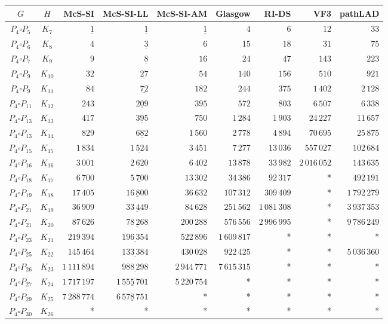 
\begin{tabular}{ccrrrrrrr}
    \toprule
    {$G$} & {$H$} & {McS-SI} & {McS-SI-LL} & {McS-SI-AM} & Glasgow & RI-DS & VF3 & pathLAD \\ 
    \midrule

$P_4\square P_{5}$ & $K_{7}$ & $\underline{1}$ & $\underline{1}$ & $\underline{1}$ & $4$ & $6$ & $12$ & $33$\\
$P_4\square P_{6}$ & $K_{8}$ & $4$ & $\underline{3}$ & $6$ & $15$ & $18$ & $31$ & $75$\\
$P_4\square P_{7}$ & $K_{9}$ & $9$ & $\underline{8}$ & $16$ & $24$ & $47$ & $143$ & $223$\\
$P_4\square P_{9}$ & $K_{10}$ & $32$ & $\underline{27}$ & $54$ & $140$ & $156$ & $510$ & $921$\\
$P_4\square P_{9}$ & $K_{11}$ & $84$ & $\underline{72}$ & $182$ & $244$ & $375$ & $1\,402$ & $2\,128$\\
$P_4\square P_{11}$ & $K_{12}$ & $243$ & $\underline{209}$ & $395$ & $572$ & $803$ & $6\,507$ & $6\,338$\\
$P_4\square P_{13}$ & $K_{13}$ & $417$ & $\underline{395}$ & $750$ & $1\,284$ & $1\,903$ & $24\,227$ & $11\,657$\\
$P_4\square P_{13}$ & $K_{14}$ & $829$ & $\underline{682}$ & $1\,560$ & $2\,778$ & $4\,894$ & $70\,695$ & $25\,875$\\
$P_4\square P_{15}$ & $K_{15}$ & $1\,834$ & $\underline{1\,524}$ & $3\,451$ & $7\,277$ & $13\,036$ & $557\,027$ & $102\,684$\\
$P_4\square P_{16}$ & $K_{16}$ & $3\,001$ & $\underline{2\,620}$ & $6\,402$ & $13\,878$ & $33\,982$ & $2\,016\,052$ & $143\,635$\\
$P_4\square P_{18}$ & $K_{17}$ & $6\,700$ & $\underline{5\,700}$ & $13\,302$ & $34\,386$ & $92\,317$ & * & $492\,191$\\
$P_4\square P_{19}$ & $K_{18}$ & $17\,405$ & $\underline{16\,800}$ & $36\,632$ & $107\,312$ & $309\,409$ & * & $1\,792\,279$\\
$P_4\square P_{21}$ & $K_{19}$ & $36\,909$ & $\underline{33\,449}$ & $84\,628$ & $251\,562$ & $1\,081\,308$ & * & $3\,937\,353$\\
$P_4\square P_{21}$ & $K_{20}$ & $87\,626$ & $\underline{78\,268}$ & $200\,288$ & $576\,556$ & $2\,996\,995$ & * & $9\,786\,249$\\
$P_4\square P_{23}$ & $K_{21}$ & $219\,394$ & $\underline{196\,354}$ & $522\,896$ & $1\,609\,817$ & * & * & *\\
$P_4\square P_{25}$ & $K_{22}$ & $145\,464$ & $\underline{133\,384}$ & $430\,028$ & $922\,425$ & * & * & $5\,036\,360$\\
$P_4\square P_{26}$ & $K_{23}$ & $1\,111\,894$ & $\underline{988\,298}$ & $2\,944\,771$ & $7\,615\,315$ & * & * & *\\
$P_4\square P_{27}$ & $K_{24}$ & $1\,717\,197$ & $\underline{1\,555\,701}$ & $5\,220\,754$ & * & * & * & *\\
$P_4\square P_{29}$ & $K_{25}$ & $7\,288\,774$ & $\underline{6\,578\,751}$ & * & * & * & * & *\\
$P_4\square P_{30}$ & $K_{26}$ & * & * & * & * & * & * & *\\

    \bottomrule
\end{tabular}

